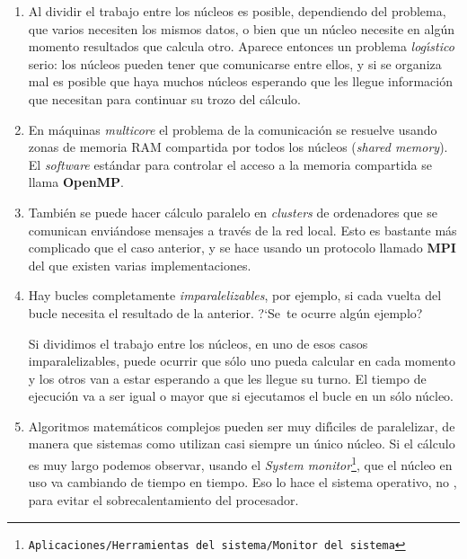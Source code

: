\begin{enumerate}
 \item Al dividir el trabajo entre los n\'ucleos es posible, dependiendo del
problema,  que varios  necesiten los mismos datos, o bien
 que un n\'ucleo necesite en alg\'un momento resultados que calcula otro.
Aparece entonces un problema {\itshape log\'{\i}stico} serio: los n\'ucleos
pueden tener que comunicarse entre ellos,  y si se organiza mal es posible que
haya muchos n\'ucleos esperando que les llegue informaci\'on que necesitan para
continuar su trozo del  c\'alculo.



\item En m\'aquinas {\itshape multicore} el problema de la comunicaci\'on se
resuelve
usando zonas de memoria RAM compartida por todos los n\'ucleos ({\itshape shared
memory}). El {\itshape software} estándar para controlar el acceso a la memoria
compartida se llama {\bf OpenMP}.


\item Tambi\'en se puede hacer c\'alculo paralelo en {\itshape clusters} de
ordenadores
que se comunican envi\'andose mensajes a trav\'es de la red local. Esto es
bastante m\'as complicado que el caso anterior, y se hace usando un protocolo
llamado {\bf MPI} del que existen varias implementaciones.

\item Hay bucles completamente {\itshape imparalelizables}, por ejemplo, si cada
vuelta del bucle necesita el resultado de la anterior. 
?`Se~te ocurre alg\'un ejemplo?

Si dividimos el trabajo entre los n\'ucleos, en uno de esos casos
imparalelizables,  puede ocurrir que s\'olo uno pueda calcular en cada momento y
los otros van a estar esperando a que les llegue su turno. El tiempo de
ejecuci\'on va a ser igual o mayor que si ejecutamos el bucle en un s\'olo
n\'ucleo. 


\item Algoritmos matem\'aticos complejos pueden ser muy dif\'{\i}ciles de
paralelizar, de manera que sistemas como {\sage} utilizan casi siempre un
\'unico
n\'ucleo. Si el c\'alculo es muy largo podemos observar, usando el
{\itshape System
monitor}\footnote{\texttt{Aplicaciones/Herramientas del sistema/Monitor del
sistema}}, que el n\'ucleo en uso va cambiando de tiempo en
tiempo. Eso lo hace el sistema operativo, no {\sage}, para evitar el
sobrecalentamiento del procesador. 




\end{enumerate}
